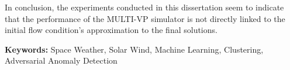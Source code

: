 In conclusion, the experiments conducted in this dissertation seem to indicate that the performance of the MULTI-VP simulator is not directly linked to the initial flow condition's approximation to the final solutions.





\vspace{1cm}
\noindent\textbf{Keywords:} Space Weather, Solar Wind, Machine Learning, Clustering, Adversarial Anomaly Detection